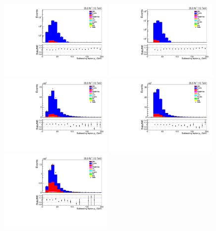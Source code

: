 \begin{figure}[ht]
\centering
\includegraphics[width=0.49\textwidth]{figs/background-estimation/plots/unblinded/prompt_ee_ttbarInc/lep2Pt_NPL_ee_lepSel_ee_log.pdf}
\includegraphics[width=0.49\textwidth]{figs/background-estimation/plots/unblinded/prompt_mumu_ttbarInc/lep2Pt_NPL_mumu_lepSel_mumu_log.pdf}
\\
\includegraphics[width=0.49\textwidth]{figs/background-estimation/plots/unblinded/prompt_ee_ttbarInc/lep2Pt_NPL_ee_jetSel_ee.pdf}
\includegraphics[width=0.49\textwidth]{figs/background-estimation/plots/unblinded/prompt_mumu_ttbarInc/lep2Pt_NPL_mumu_jetSel_mumu.pdf}
\\
\includegraphics[width=0.49\textwidth]{figs/background-estimation/plots/unblinded/prompt_ee_ttbarInc/lep2Pt_NPL_ee_wMass_ee.pdf}

\end{figure}
